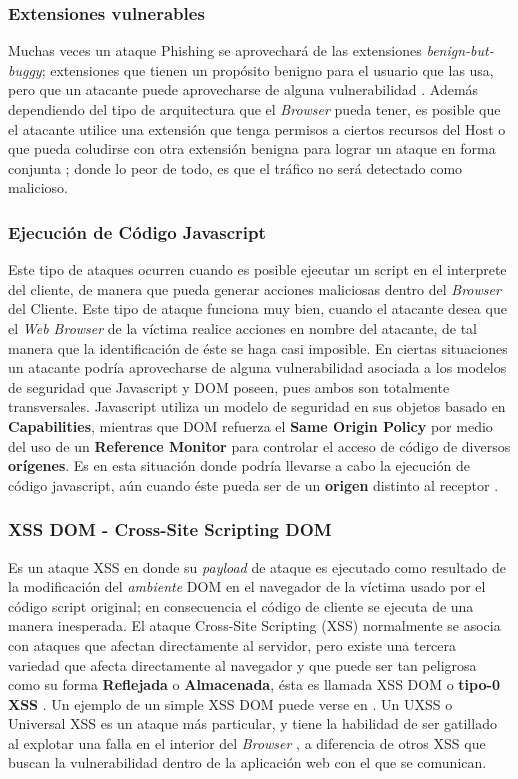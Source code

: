 	\subsubsection{Extensiones vulnerables}
	Muchas veces un ataque Phishing se aprovechará de las extensiones \textit{benign-but-buggy}; extensiones que tienen un propósito benigno para el usuario que las usa, pero que un atacante puede aprovecharse de alguna vulnerabilidad \cite{Barth2010, Liu2012}. Además dependiendo del tipo de arquitectura que el \textit{Browser} pueda tener, es posible que el atacante utilice una extensión que tenga permisos a ciertos recursos del Host o que pueda coludirse con otra extensión benigna para lograr un ataque en forma conjunta \cite{Saini2014}; donde lo peor de todo, es que el tráfico no será detectado como malicioso.

	\subsubsection{Ejecución de Código Javascript}
    Este tipo de ataques ocurren cuando es posible ejecutar un script en el interprete del cliente, de manera que pueda generar acciones maliciosas dentro del \textit{Browser} del Cliente. Este tipo de ataque funciona muy bien, cuando el atacante desea que el \textit{Web Browser} de la víctima realice acciones en nombre del atacante, de tal manera que la identificación de éste se haga casi imposible. En ciertas situaciones un atacante podría aprovecharse de alguna vulnerabilidad asociada a los modelos de seguridad que Javascript y DOM poseen, pues ambos son totalmente transversales. Javascript utiliza un modelo de seguridad en sus objetos basado en \textbf{Capabilities}, mientras que DOM refuerza el \textbf{Same Origin Policy} por medio del uso de un \textbf{Reference Monitor} para controlar el acceso de código de diversos \textbf{orígenes}. Es en esta situación donde podría llevarse a cabo la ejecución de código javascript, aún cuando éste pueda ser de un \textbf{origen} distinto al receptor \cite{Barth2009}.

	\subsubsection{XSS DOM - Cross-Site Scripting DOM}
	Es un ataque XSS en donde su \textit{payload} de ataque es ejecutado como resultado de la modificación del \textit{ambiente} DOM en el navegador de la víctima usado por el código script original; en consecuencia el código de cliente se ejecuta de una manera inesperada. El ataque Cross-Site Scripting (XSS) normalmente se asocia con ataques que afectan directamente al servidor, pero existe una tercera variedad que afecta directamente al navegador \cite{Singh2014} y que puede ser tan peligrosa como su forma \textbf{Reflejada} o \textbf{Almacenada}, ésta es llamada XSS DOM o \textbf{tipo-0 XSS} \cite{XSSDOMOwasp, XSSDOM}. Un ejemplo de un simple XSS DOM puede verse en \cite{bugzillaXSSDOM}. Un UXSS o Universal XSS es un ataque más particular, y tiene la habilidad de ser gatillado al explotar una falla en el interior del \textit{Browser} \cite{Paola2006}, a diferencia de otros XSS que buscan la vulnerabilidad dentro de la aplicación web con el que se comunican.


